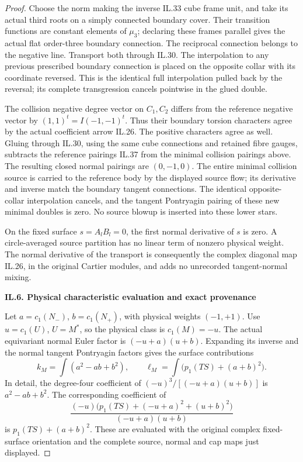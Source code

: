 \begin{proof}
Choose the norm making the inverse IL.33 cube frame unit,
and take its actual third roots on a simply connected
boundary cover. Their transition functions are constant
elements of \(\mu_3\); declaring these frames parallel
gives the actual flat order-three boundary connection.
The reciprocal connection belongs to the negative line.
Transport both through IL.30. The interpolation to any
previous prescribed boundary connection is placed on the
opposite collar with its coordinate reversed. This is the
identical full interpolation pulled back by the reversal;
its complete transgression cancels pointwise in the glued
double.

The collision negative degree vector on \(C_1,C_2\)
differs from the reference negative vector by
\((1,1)^t=I(-1,-1)^t\). Thus their boundary torsion
characters agree by the actual coefficient arrow IL.26.
The positive characters agree as well. Gluing through IL.30, using the same cube connections and retained
fibre gauges, subtracts the reference pairings IL.37 from the minimal
collision pairings above.  The resulting closed normal pairings are
\((0,-1,0)\).  The entire minimal collision source is carried to
the reference body by the displayed source flow; its derivative and
inverse match the boundary tangent connections.  The identical
opposite-collar interpolation cancels, and the tangent Pontryagin
pairing of these new minimal doubles is zero.  No source blowup is
inserted into these lower stars.

On the fixed surface \(s=A_lB_l=0\), the first normal
derivative of \(s\) is zero. A circle-averaged source
partition has no linear term of nonzero physical weight.
The normal derivative of the transport is consequently
the complex diagonal map IL.26, in the original Cartier
modules, and adds no unrecorded tangent-normal mixing.

\par

\medskip\noindent\textbf{IL.6. Physical characteristic evaluation and exact provenance}

\par\nobreak

Let \(a=c_1(N_-)\), \(b=c_1(N_+)\), with physical weights
\((-1,+1)\). Use \(u=c_1(U)\), \(U=M^*\), so the
physical class is \(c_1(M)=-u\). The actual equivariant
normal Euler factor is \((-u+a)(u+b)\). Expanding its
inverse and the normal tangent Pontryagin factors gives
the surface contributions
\[
 k_M=\int(a^2-ab+b^2),\qquad
 \ell_M=\int\bigl(p_1(TS)+(a+b)^2\bigr).
 \tag{IL.41}
\]
In detail, the degree-four coefficient of
\((-u)^3/[(-u+a)(u+b)]\) is \(a^2-ab+b^2\).
The corresponding coefficient of
\[
 \frac{(-u)\bigl(p_1(TS)+(-u+a)^2+(u+b)^2\bigr)}
                {(-u+a)(u+b)}
\]
is \(p_1(TS)+(a+b)^2\). These are evaluated with
the original complex fixed-surface orientation and the complete
source, normal and cap maps just displayed.


\end{proof}
